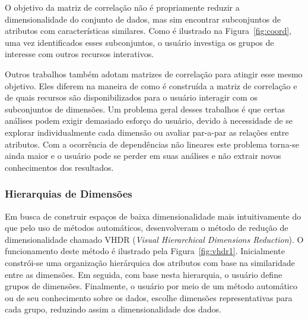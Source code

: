 O objetivo da matriz de correlação não é propriamente
reduzir a dimensionalidade do conjunto de dados, mas sim
encontrar subconjuntos de atributos com características
similares. Como é ilustrado na Figura~\ref{fig:coord}, uma
vez identificados esses subconjuntos, o usuário investiga os
grupos de interesse com outros recursos interativos. 

Outros trabalhos
\cite{Friendly2002,MacEachren2003,RBF2004,May2011ss,Johansson2009,Ingram2010,May2011}
também adotam matrizes de correlação para atingir esse mesmo
objetivo. Eles diferem na maneira de como é construída a
matriz de correlação e de quais recursos são
disponibilizados para o usuário interagir com os
subconjuntos de dimensões. Um problema geral desses
trabalhos é que certas análises podem exigir demasiado
esforço do usuário, devido à necessidade de se explorar
individualmente cada dimensão ou avaliar par-a-par as
relações entre atributos. Com a ocorrência de dependências
não lineares este problema torna-se ainda maior e o usuário
pode se perder em suas análises e não extrair novos
conhecimentos dos resultados. 


\subsubsection{Hierarquias de Dimensões}

Em busca de construir espaços de baixa dimensionalidade mais
intuitivamente do que pelo uso de métodos automáticos,
\cite{Yang2003} desenvolveram o método de redução de
dimensionalidade chamado VHDR (\emph{Visual Hierarchical
Dimensions Reduction}). O funcionamento deste método é
ilustrado pela Figura~\ref{fig:vhdr1}. Inicialmente
constrói-se uma organização hierárquica dos atributos com
base na similaridade entre as dimensões. Em seguida, com
base nesta hierarquia, o usuário define grupos de dimensões.
Finalmente, o usuário por meio de um método automático ou de
seu conhecimento sobre os dados, escolhe dimensões
representativas para cada grupo, reduzindo assim a
dimensionalidade dos dados. 

